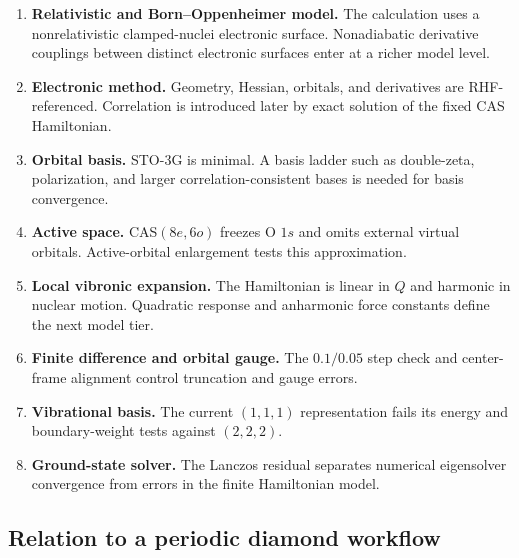 \documentclass[10pt,twocolumn]{article}
\begin{document}
\begin{enumerate}[leftmargin=1.35em,itemsep=2pt]
\item \textbf{Relativistic and Born--Oppenheimer model.}  The calculation uses
a nonrelativistic clamped-nuclei electronic surface.  Nonadiabatic derivative
couplings between distinct electronic surfaces enter at a richer model level.
\item \textbf{Electronic method.}  Geometry, Hessian, orbitals, and derivatives
are RHF-referenced.  Correlation is introduced later by exact solution of the
fixed CAS Hamiltonian.
\item \textbf{Orbital basis.}  STO-3G is minimal.  A basis ladder such as
double-zeta, polarization, and larger correlation-consistent bases is needed
for basis convergence.
\item \textbf{Active space.}  CAS$(8e,6o)$ freezes O $1s$ and omits external
virtual orbitals.  Active-orbital enlargement tests this approximation.
\item \textbf{Local vibronic expansion.}  The Hamiltonian is linear in $Q$ and
harmonic in nuclear motion.  Quadratic response and anharmonic force constants
define the next model tier.
\item \textbf{Finite difference and orbital gauge.}  The $0.1/0.05$ step check
and center-frame alignment control truncation and gauge errors.
\item \textbf{Vibrational basis.}  The current $(1,1,1)$ representation fails its
energy and boundary-weight tests against $(2,2,2)$.
\item \textbf{Ground-state solver.}  The Lanczos residual separates numerical
eigensolver convergence from errors in the finite Hamiltonian model.
\end{enumerate}

\subsection*{Relation to a periodic diamond workflow}
\end{document}
